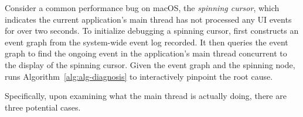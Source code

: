 


Consider a common performance bug on macOS, the \emph{spinning cursor},
which indicates the current application's main thread has not processed
any UI events for over two seconds.  To initialize debugging a spinning
cursor, \xxx first constructs an event graph from the system-wide event
log recorded.  It then queries the event graph to find the ongoing event
in the application's main thread concurrent to the display of the spinning
cursor.  Given the event graph and the spinning node, \xxx runs
Algorithm~\ref{alg:alg-diagnosis} to interactively pinpoint the root
cause.

Specifically, upon examining what the main thread is actually doing, there
are three potential cases.

